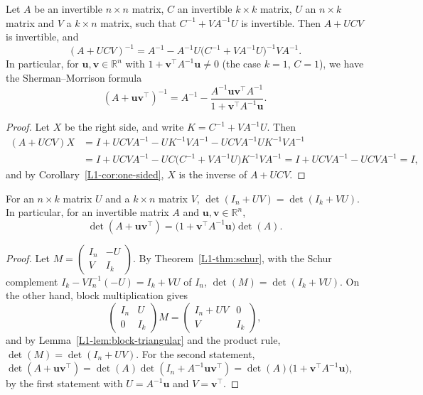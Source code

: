 \begin{theorem}\label{L1-thm:woodbury}
    Let $A$ be an invertible $n \times n$ matrix, $C$ an invertible $k \times k$ matrix, $U$ an $n \times k$ matrix and $V$ a $k \times n$ matrix, such that $C^{-1} + VA^{-1}U$ is invertible. Then $A + UCV$ is invertible, and
    \[(A + UCV)^{-1} = A^{-1} - A^{-1}U\big(C^{-1} + VA^{-1}U\big)^{-1}VA^{-1}.\]
    In particular, for $\mathbf{u}, \mathbf{v} \in \mathbb{R}^n$ with $1 + \mathbf{v}^\top A^{-1}\mathbf{u} \neq 0$ (the case $k = 1$, $C = 1$), we have the Sherman--Morrison formula
    \[(A + \mathbf{u}\mathbf{v}^\top)^{-1} = A^{-1} - \frac{A^{-1}\mathbf{u}\mathbf{v}^\top A^{-1}}{1 + \mathbf{v}^\top A^{-1}\mathbf{u}}.\]
\end{theorem}

\begin{proof}
    Let $X$ be the right side, and write $K = C^{-1} + VA^{-1}U$. Then
    \begin{align*}
        (A + UCV)X &= I + UCVA^{-1} - UK^{-1}VA^{-1} - UCVA^{-1}UK^{-1}VA^{-1} \\
        &= I + UCVA^{-1} - UC\big(C^{-1} + VA^{-1}U\big)K^{-1}VA^{-1} = I + UCVA^{-1} - UCVA^{-1} = I,
    \end{align*}
    and by Corollary~\ref{L1-cor:one-sided}, $X$ is the inverse of $A + UCV$.
\end{proof}

\begin{proposition}\label{L1-prop:det-lemma}
    For an $n \times k$ matrix $U$ and a $k \times n$ matrix $V$, $\det(I_n + UV) = \det(I_k + VU)$. In particular, for an invertible matrix $A$ and $\mathbf{u}, \mathbf{v} \in \mathbb{R}^n$,
    \[\det(A + \mathbf{u}\mathbf{v}^\top) = \big(1 + \mathbf{v}^\top A^{-1}\mathbf{u}\big)\det(A).\]
\end{proposition}

\begin{proof}
    Let $M = \begin{pmatrix} I_n & -U \\ V & I_k \end{pmatrix}$. By Theorem~\ref{L1-thm:schur}, with the Schur complement $I_k - VI_n^{-1}(-U) = I_k + VU$ of $I_n$, $\det(M) = \det(I_k + VU)$. On the other hand, block multiplication gives
    \[\begin{pmatrix} I_n & U \\ 0 & I_k \end{pmatrix}M = \begin{pmatrix} I_n + UV & 0 \\ V & I_k \end{pmatrix},\]
    and by Lemma~\ref{L1-lem:block-triangular} and the product rule, $\det(M) = \det(I_n + UV)$. For the second statement, $\det(A + \mathbf{u}\mathbf{v}^\top) = \det(A)\det(I_n + A^{-1}\mathbf{u}\mathbf{v}^\top) = \det(A)\big(1 + \mathbf{v}^\top A^{-1}\mathbf{u}\big)$, by the first statement with $U = A^{-1}\mathbf{u}$ and $V = \mathbf{v}^\top$.
\end{proof}

